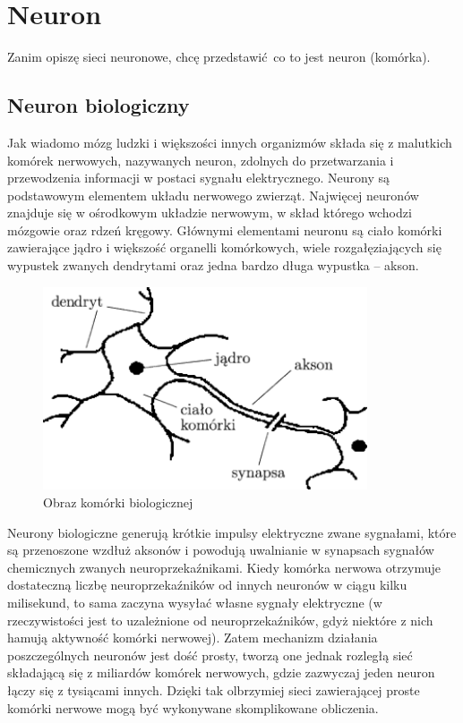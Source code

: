 \documentclass{article}
\begin{document}
\section{Neuron}
Zanim opiszę sieci neuronowe, chcę przedstawić co to jest neuron (komórka).

\subsection{Neuron biologiczny}
Jak wiadomo mózg ludzki i większości innych organizmów składa się z malutkich komórek nerwowych, nazywanych neuron, zdolnych do przetwarzania i przewodzenia informacji w postaci sygnału elektrycznego. Neurony są podstawowym elementem układu nerwowego zwierząt. Najwięcej neuronów znajduje się w ośrodkowym układzie nerwowym, w skład którego wchodzi mózgowie oraz rdzeń kręgowy. \cite{neuroscience}
Głównymi elementami neuronu są ciało komórki zawierające jądro i większość organelli komórkowych, wiele rozgałęziających się wypustek zwanych dendrytami oraz jedna bardzo długa wypustka -- akson. \cite{geron}

\begin{figure}[H]
	\centering
	\includegraphics[width=\textwidth,height=6cm,keepaspectratio=true]{neuron_bio}
	\caption{
		Obraz komórki biologicznej \cite{neuron_bio}
	}
\end{figure}

Neurony biologiczne generują krótkie impulsy elektryczne zwane sygnałami, które są przenoszone wzdłuż aksonów i powodują uwalnianie w synapsach sygnałów chemicznych zwanych neuroprzekaźnikami. Kiedy komórka nerwowa otrzymuje dostateczną liczbę neuroprzekaźników od innych neuronów w ciągu kilku milisekund, to sama zaczyna wysyłać własne sygnały elektryczne (w rzeczywistości jest to uzależnione od neuroprzekaźników, gdyż niektóre z nich hamują aktywność komórki nerwowej). \cite{geron}
Zatem mechanizm działania poszczególnych neuronów jest dość prosty, tworzą one jednak rozległą sieć składającą się z miliardów komórek nerwowych, gdzie zazwyczaj jeden neuron łączy się z tysiącami innych. Dzięki tak olbrzymiej sieci zawierającej proste komórki nerwowe mogą być wykonywane skomplikowane obliczenia.
\end{document}
